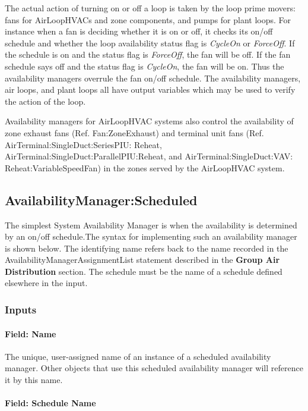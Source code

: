 The actual action of turning on or off a loop is taken by the loop prime movers: fans for AirLoopHVACs and zone components, and pumps for plant loops. For instance when a fan is deciding whether it is on or off, it checks its on/off schedule and whether the loop availability status flag is \emph{CycleOn} or \emph{ForceOff}. If the schedule is on and the status flag is \emph{ForceOff}, the fan will be off. If the fan schedule says off and the status flag is \emph{CycleOn}, the fan will be on. Thus the availability managers overrule the fan on/off schedule. The availability managers, air loops, and plant loops all have output variables which may be used to verify the action of the loop.

Availability managers for AirLoopHVAC systems also control the availability of zone exhaust fans (Ref. Fan:ZoneExhaust) and terminal unit fans (Ref. AirTerminal:SingleDuct:SeriesPIU: Reheat, AirTerminal:SingleDuct:ParallelPIU:Reheat, and AirTerminal:SingleDuct:VAV: Reheat:VariableSpeedFan) in the zones served by the AirLoopHVAC system.

\subsection{AvailabilityManager:Scheduled}\label{availabilitymanagerscheduled}

The simplest System Availability Manager is when the availability is determined by an on/off schedule.The syntax for implementing such an availability manager is shown below. The identifying name refers back to the name recorded in the AvailabilityManagerAssignmentList statement described in the \textbf{Group Air Distribution} section. The schedule must be the name of a schedule defined elsewhere in the input.

\subsubsection{Inputs}\label{inputs-047}

\paragraph{Field: Name}\label{field-name-046}

The unique, user-assigned name of an instance of a scheduled availability manager. Other objects that use this scheduled availability manager will reference it by this name.

\paragraph{Field: Schedule Name}\label{field-schedule-name-006}

